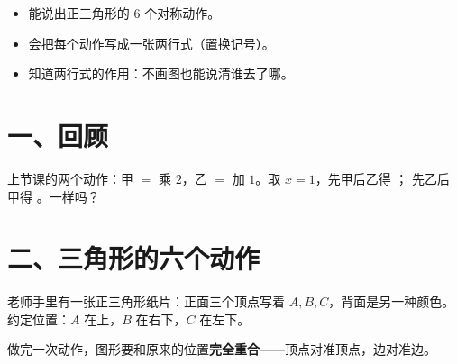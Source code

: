 


\begin{mubiao}
  \begin{itemize}
    \item 能说出正三角形的 \(6\) 个对称动作。
    \item 会把每个动作写成一张两行式（置换记号）。
    \item 知道两行式的作用：不画图也能说清谁去了哪。
  \end{itemize}
\end{mubiao}

\section*{一、回顾}

\begin{sikao}
  上节课的两个动作：甲 \(=\) 乘 \(2\)，乙 \(=\) 加 \(1\)。取 \(x=1\)，先甲后乙得 \underline{\hspace{2em}}；
  先乙后甲得 \underline{\hspace{2em}}。一样吗？\underline{\hspace{2em}}
\end{sikao}

\section*{二、三角形的六个动作}

\noindent 老师手里有一张正三角形纸片：正面三个顶点写着 \(A,B,C\)，背面是另一种颜色。
约定位置：\(A\) 在上，\(B\) 在右下，\(C\) 在左下。

\begin{definition}[对称动作]
  做完一次动作，图形要和原来的位置\textbf{完全重合}——顶点对准顶点，边对准边。
\end{definition}

